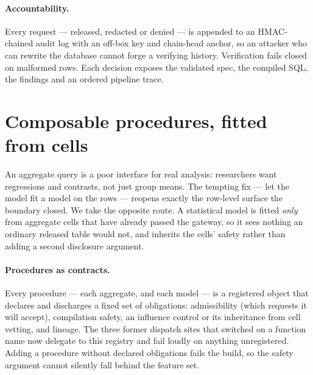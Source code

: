 \documentclass[11pt,a4paper]{article}
\begin{document}
\paragraph{Accountability.}
Every request --- released, redacted or denied --- is appended to an
HMAC-chained audit log with an off-box key and chain-head anchor, so an
attacker who can rewrite the database cannot forge a verifying history.
Verification fails closed on malformed rows. Each decision exposes the
validated spec, the compiled SQL, the findings and an ordered pipeline trace.

\section{Composable procedures, fitted from cells}
\label{sec:procedures}

An aggregate query is a poor interface for real analysis: researchers want
regressions and contrasts, not just group means. The tempting fix --- let the
model fit a model on the rows --- reopens exactly the row-level surface the
boundary closed. We take the opposite route. A statistical model is fitted
\emph{only} from aggregate cells that have already passed the gateway, so it
sees nothing an ordinary released table would not, and inherits the cells'
safety rather than adding a second disclosure argument.

\paragraph{Procedures as contracts.}
Every procedure --- each aggregate, and each model --- is a registered object
that declares and discharges a fixed set of obligations: admissibility (which
requests it will accept), compilation safety, an influence control or its
inheritance from cell vetting, and lineage. The three former dispatch sites
that switched on a function name now delegate to this registry and fail loudly
on anything unregistered. Adding a procedure without declared obligations fails
the build, so the safety argument cannot silently fall behind the feature set.
\end{document}
